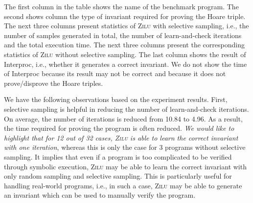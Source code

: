 The first column in the table shows the name of the benchmark program. The second shows column the type of invariant required for proving the Hoare triple. The next three columns present statistics of \textsc{Zilu} with selective sampling, i.e., the number of samples generated in total, the number of learn-and-check iterations and the total execution time. The next three columns present the corresponding statistics of \textsc{Zilu} without selective sampling.
The last column shows the result of Interproc, i.e., whether it generates a correct invariant. We do not show the time of Interproc because its result may not be correct and because it does not prove/disprove the Hoare triples.

We have the following observations based on the experiment results. First, selective sampling is helpful in reducing the number of learn-and-check iterations.
On average, the number of iterations is reduced from 10.84 to 4.96. As a result, the time required for proving the program is often reduced.
\emph{We would like to highlight that for 12 out of 32 cases, \textsc{Zilu} is able to learn the correct invariant with one iteration}, whereas this is only the case for 3 programs without selective sampling. It implies that even if a program is too complicated to be verified through symbolic execution, \textsc{Zilu} may be able to learn the correct invariant with only random sampling and selective sampling.
This is particularly useful for handling real-world programs, i.e., in such a case, \textsc{Zilu} may be able to generate an invariant which can be used to manually verify the program.

